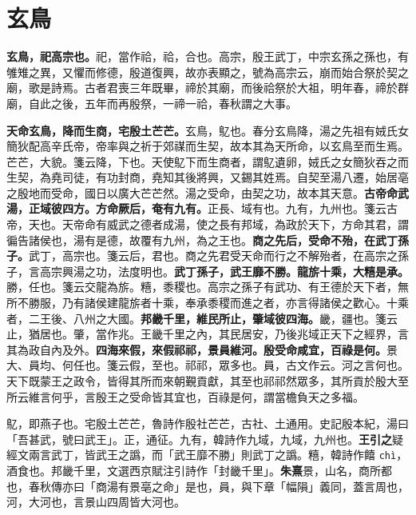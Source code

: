 \section{玄鳥}


\textbf{玄鳥，祀高宗也。}{\footnotesize 祀，當作祫，祫，合也。高宗，殷王武丁，中宗玄孫之孫也，有雊雉之異，又懼而修德，殷道復興，故亦表顯之，號為高宗云，崩而始合祭於契之廟，歌是詩焉。古者君喪三年既畢，禘於其廟，而後祫祭於大祖，明年春，禘於群廟，自此之後，五年而再殷祭，一禘一祫，春秋謂之大事。}

\textbf{天命玄鳥，降而生商，宅殷土芒芒。}{\footnotesize 玄鳥，鳦也。春分玄鳥降，湯之先祖有娀氏女簡狄配高辛氏帝，帝率與之祈于郊禖而生契，故本其為天所命，以玄鳥至而生焉。芒芒，大貌。箋云降，下也。天使鳦下而生商者，謂鳦遺卵，娀氏之女簡狄吞之而生契，為堯司徒，有功封商，堯知其後將興，又錫其姓焉。自契至湯八遷，始居亳之殷地而受命，國日以廣大芒芒然。湯之受命，由契之功，故本其天意。}\textbf{古帝命武湯，正域彼四方。方命厥后，奄有九有。}{\footnotesize 正長、域有也。九有，九州也。箋云古帝，天也。天帝命有威武之德者成湯，使之長有邦域，為政於天下，方命其君，謂徧告諸侯也，湯有是德，故覆有九州，為之王也。}\textbf{商之先后，受命不殆，在武丁孫子。}{\footnotesize 武丁，高宗也。箋云后，君也。商之先君受天命而行之不解殆者，在高宗之孫子，言高宗興湯之功，法度明也。}\textbf{武丁孫子，武王靡不勝。龍旂十乘，大糦是承。}{\footnotesize 勝，任也。箋云交龍為旂。糦，黍稷也。高宗之孫子有武功、有王德於天下者，無所不勝服，乃有諸侯建龍旂者十乘，奉承黍稷而進之者，亦言得諸侯之歡心。十乘者，二王後、八州之大國。}\textbf{邦畿千里，維民所止，肇域彼四海。}{\footnotesize 畿，疆也。箋云止，猶居也。肇，當作兆。王畿千里之內，其民居安，乃後兆域正天下之經界，言其為政自內及外。}\textbf{四海來假，來假祁祁，景員維河。殷受命咸宜，百祿是何。}{\footnotesize 景大、員均、何任也。箋云假，至也。祁祁，眾多也。員，古文作云。河之言何也。天下既蒙王之政令，皆得其所而來朝覲貢獻，其至也祁祁然眾多，其所貢於殷大至所云維言何乎，言殷王之受命皆其宜也，百祿是何，謂當檐負天之多福。}

\begin{quoting}鳦，即燕子也。宅殷土芒芒，魯詩作殷社芒芒，古社、土通用。史記殷本紀，湯曰「吾甚武，號曰武王」。正，通征。九有，韓詩作九域，九域，九州也。\textbf{王引之}疑經文兩言武丁，皆武王之譌，而「武王靡不勝」則武丁之譌。糦，韓詩作饎 \texttt{chì}，酒食也。邦畿千里，文選西京賦注引詩作「封畿千里」。\textbf{朱熹}景，山名，商所都也，春秋傳亦曰「商湯有景亳之命」是也，員，與下章「幅隕」義同，蓋言周也，河，大河也，言景山四周皆大河也。\end{quoting}

